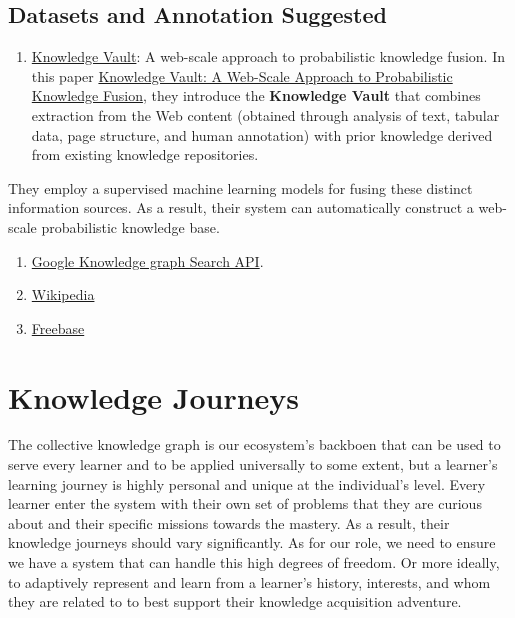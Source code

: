 \documentclass[]{book}
\providecommand{\tightlist}{%
  \setlength{\itemsep}{0pt}\setlength{\parskip}{0pt}}
\theoremstyle{definition}
\theoremstyle{definition}
\theoremstyle{definition}
\theoremstyle{remark}
\begin{document}
\subsection{Datasets and Annotation
Suggested}\label{datasets-and-annotation-suggested-1}

\begin{enumerate}
\def\labelenumi{\arabic{enumi}.}
\tightlist
\item
  \href{https://ai.google/research/pubs/pub45634}{Knowledge Vault}: A
  web-scale approach to probabilistic knowledge fusion. In this paper
  \href{https://dejanseo.com.au/wp-content/uploads/2014/08/Knowledge-Vault-A-Web-Scale-Approach-to-Probabilistic-Knowledge-Fusion.pdf}{Knowledge
  Vault: A Web-Scale Approach to Probabilistic Knowledge Fusion}, they
  introduce the \textbf{Knowledge Vault} that combines extraction from
  the Web content (obtained through analysis of text, tabular data, page
  structure, and human annotation) with prior knowledge derived from
  existing knowledge repositories.
\end{enumerate}

They employ a supervised machine learning models for fusing these
distinct information sources. As a result, their system can
automatically construct a web-scale probabilistic knowledge base.

\begin{enumerate}
\def\labelenumi{\arabic{enumi}.}
\setcounter{enumi}{1}
\item
  \href{https://developers.google.com/knowledge-graph/\#knowledge_graph_entities}{Google
  Knowledge graph Search API}.
\item
  \href{wikipedia.com}{Wikipedia}
\item
  \href{Freebase.com}{Freebase}
\end{enumerate}

\section{Knowledge Journeys}\label{knowledge-journeys-1}

The collective knowledge graph is our ecosystem's backboen that can be
used to serve every learner and to be applied universally to some
extent, but a learner's learning journey is highly personal and unique
at the individual's level. Every learner enter the system with their own
set of problems that they are curious about and their specific missions
towards the mastery. As a result, their knowledge journeys should vary
significantly. As for our role, we need to ensure we have a system that
can handle this high degrees of freedom. Or more ideally, to adaptively
represent and learn from a learner's history, interests, and whom they
are related to to best support their knowledge acquisition adventure.
\end{document}
